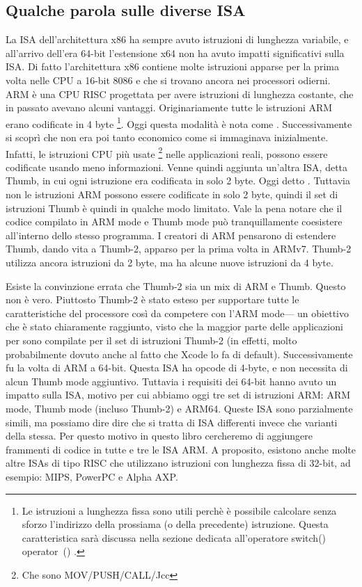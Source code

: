 %
%
%

\subsection{Qualche parola sulle diverse \ac{ISA}}
La \ac{ISA} dell'architettura x86 ha sempre avuto istruzioni di lunghezza variabile, e all'arrivo dell'era 64-bit l'estensione x64 non ha avuto impatti significativi sulla \ac{ISA}. Di fatto l'architettura x86 contiene molte istruzioni apparse per la prima volta nelle CPU a 16-bit 8086 e che si trovano ancora nei processori odierni.
ARM è una \ac{CPU} \ac{RISC} progettata per avere istruzioni di lunghezza costante, che in passato avevano alcuni vantaggi.
Originariamente tutte le istruzioni ARM erano codificate in 4 byte%
\footnote{
Le istruzioni a lunghezza fissa sono utili perchè è possibile calcolare senza sforzo l'indirizzo della prossiama (o della precedente) istruzione.
Questa caratteristica sarà discussa nella sezione dedicata all'operatore switch() operator~() .
}.
Oggi questa modalità è nota come .
Successivamente si scoprì che non era poi tanto economico come si immaginava inizialmente.
Infatti, le istruzioni \ac{CPU} più usate \footnote{Che sono MOV/PUSH/CALL/Jcc} nelle applicazioni reali, possono essere codificate usando meno informazioni.
Venne quindi aggiunta un'altra \ac{ISA}, detta Thumb, in cui ogni istruzione era codificata in solo 2 byte.
Oggi detto .
Tuttavia non  le istruzioni ARM possono essere codificate in solo 2 byte, quindi il set di istruzioni Thumb è quindi in qualche modo limitato.
Vale la pena notare che il codice compilato in ARM mode e Thumb mode può tranquillamente coesistere all'interno dello stesso programma.
I creatori di ARM pensarono di estendere Thumb, dando vita a Thumb-2, apparso per la prima volta in ARMv7.
Thumb-2 utilizza ancora istruzioni da 2 byte, ma ha alcune nuove istruzioni da 4 byte.

Esiste la convinzione errata che Thumb-2 sia un mix di ARM e Thumb. Questo non è vero.
Piuttosto Thumb-2 è stato esteso per supportare tutte le caratteristiche del processore così da competere con l'ARM mode--- un obiettivo che è stato chiaramente raggiunto, visto che la maggior parte delle applicazioni per \idevices sono compilate per il set di istruzioni Thumb-2 (in effetti, molto probabilmente dovuto anche al fatto che Xcode lo fa di default).
Successivamente fu la volta di ARM a 64-bit. Questa \ac{ISA} ha opcode di 4-byte, e non necessita di alcun Thumb mode aggiuntivo.
Tuttavia i requisiti dei 64-bit hanno avuto un impatto sulla \ac{ISA}, motivo per cui abbiamo oggi tre set di istruzioni ARM: ARM mode, Thumb mode (incluso Thumb-2) e ARM64.
Queste \ac{ISA} sono parzialmente simili, ma possiamo dire dire che si tratta di \ac{ISA} differenti invece che varianti della stessa.
Per questo motivo in questo libro cercheremo di aggiungere frammenti di codice in tutte e tre le \ac{ISA} ARM.
%
%
%
A proposito, esistono anche molte altre \ac{ISA}s di tipo \ac{RISC} che utilizzano istruzioni con lunghezza fissa di 32-bit, ad esempio: MIPS, PowerPC e Alpha AXP.
